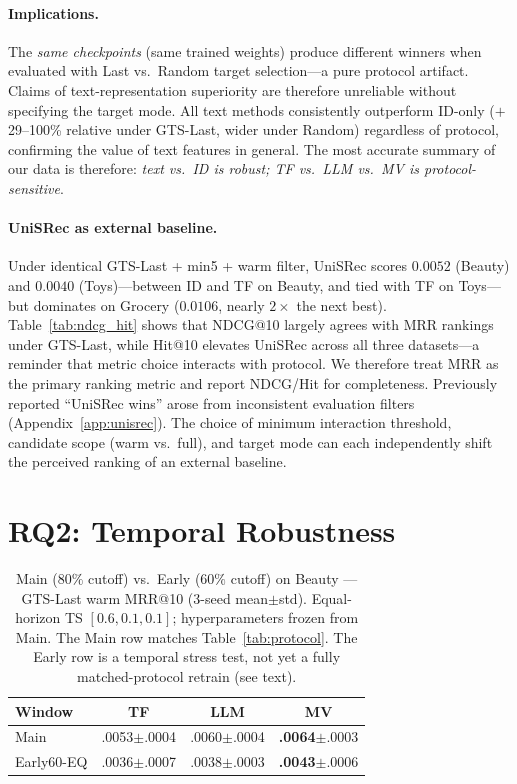 \documentclass[sigconf,natbib=true,anonymous]{acmart}
\begin{document}
\paragraph{Implications.}
The \emph{same checkpoints} (same trained weights) produce different winners when evaluated with Last vs.\ Random target selection---a pure protocol artifact.
Claims of text-representation superiority are therefore unreliable without specifying the target mode.
All text methods consistently outperform ID-only ($+$29--100\% relative under GTS-Last, wider under Random) regardless of protocol, confirming the value of text features in general.
The most accurate summary of our data is therefore: \emph{text vs.\ ID is robust; TF vs.\ LLM vs.\ MV is protocol-sensitive}.

\paragraph{UniSRec as external baseline.}
Under identical GTS-Last + min5 + warm filter, UniSRec scores $0.0052$ (Beauty) and $0.0040$ (Toys)---between ID and TF on Beauty, and tied with TF on Toys---but dominates on Grocery ($0.0106$, nearly $2\times$ the next best).
Table~\ref{tab:ndcg_hit} shows that NDCG@10 largely agrees with MRR rankings under GTS-Last, while Hit@10 elevates UniSRec across all three datasets---a reminder that metric choice interacts with protocol.
We therefore treat MRR as the primary ranking metric and report NDCG/Hit for completeness.
Previously reported ``UniSRec wins'' arose from inconsistent evaluation filters (Appendix~\ref{app:unisrec}).
The choice of minimum interaction threshold, candidate scope (warm vs.\ full), and target mode can each independently shift the perceived ranking of an external baseline.

\section{RQ2: Temporal Robustness}
\label{sec:rq2}

\begin{table}[t]
\centering
\caption{%
Main ($80\%$ cutoff) vs.\ Early ($60\%$ cutoff) on Beauty --- GTS-Last warm MRR@10 (3-seed mean$\pm$std).
Equal-horizon TS $[0.6,0.1,0.1]$; hyperparameters frozen from Main.
The Main row matches Table~\ref{tab:protocol}.
The Early row is a temporal stress test, not yet a fully matched-protocol retrain (see text).%
}
\label{tab:early}
\small
\begin{tabular}{@{}lccc@{}}
\toprule
Window & TF & LLM & MV \\
\midrule
Main      & .0053\tiny{$\pm$.0004} & .0060\tiny{$\pm$.0004} & \textbf{.0064}\tiny{$\pm$.0003} \\
Early60-EQ & .0036\tiny{$\pm$.0007} & .0038\tiny{$\pm$.0003} & \textbf{.0043}\tiny{$\pm$.0006} \\
\bottomrule
\end{tabular}
\end{table}
\end{document}
